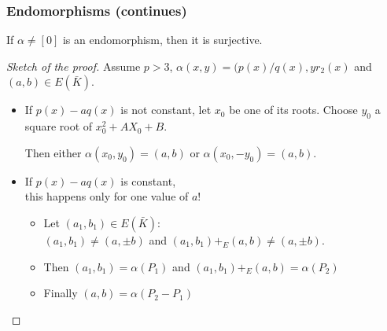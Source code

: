 \documentclass[12pt,handout]{beamer} %
\theoremstyle{definition}
\begin{document}
\begin{frame}
\frametitle{Endomorphisms (continues)}

\begin{theorem} If $\alpha\neq[0]$ is an endomorphism, then it is surjective.
\end{theorem}\pause

\begin{proof}[Sketch of the proof] Assume \alert{$p>3$}, \alert{$\alpha(x,y)=(p(x)/q(x),yr_2(x)$} and \alert{$(a,b)\in E(\bar{K})$}.\medskip

\begin{itemize}
  \item If \alert{$p(x)-aq(x)$} is not constant, let $x_0$ be one of its roots.
Choose $y_0$ a square root of $x_0^2+AX_0+B$.\medskip

Then either \alert{$\alpha(x_0,y_0)=(a,b)$} or \alert{$\alpha(x_0,-y_0)=(a,b)$}.\medskip

  \item If \alert{$p(x)-aq(x)$} is  constant,\\
\hfill   this happens only for one value of $a$!
\begin{itemize}
\item[] Let \alert{$(a_1,b_1)\in E(\bar{K})$}:\\
\alert{$(a_1,b_1)\neq (a,\pm b)$} and \alert{$(a_1,b_1)+_E(a, b)\neq (a,\pm b).$}\medskip

\item[] Then \alert{$(a_1,b_1)=\alpha(P_1)$} and \alert{$(a_1,b_1)+_E(a,b)=\alpha(P_2)$}\medskip

\item[] Finally \alert{$(a,b)=\alpha(P_2-P_1)$}
\end{itemize}
\end{itemize}
\end{proof}
\end{frame}
\end{document}
